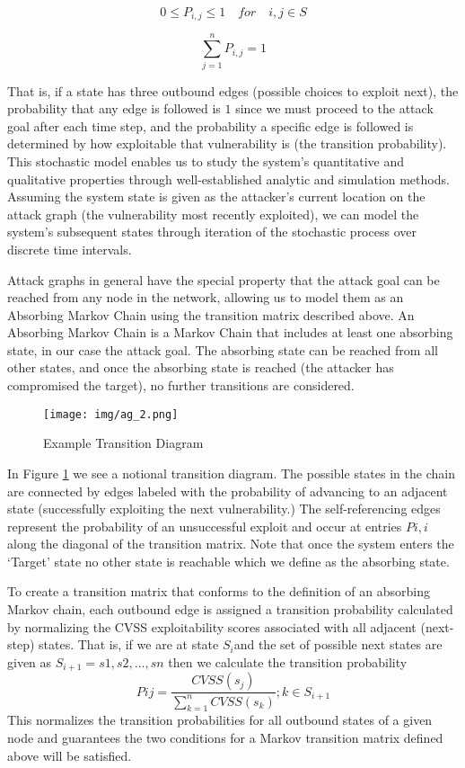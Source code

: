 \[0 \leq P_{i,j} \leq 1\quad for\quad i,j \in S\]

\[\sum_{j=1}^{n} P_{i,j} = 1\]

That is, if a state has three outbound edges (possible choices to exploit next), the probability that any edge is followed is \(1\) since we must proceed to the attack goal after each time step, and the probability a specific edge is followed is determined by how exploitable that vulnerability is (the transition probability). This stochastic model enables us to study the system’s quantitative and qualitative properties through well-established analytic and simulation methods. Assuming the system state is given as the attacker’s current location on the attack graph (the vulnerability most recently exploited), we can model the system’s subsequent states through iteration of the stochastic process over discrete time intervals.  

 

Attack graphs in general have the special property that the attack goal can be reached from any node in the network, allowing us to model them as an Absorbing Markov Chain using the transition matrix described above. An Absorbing Markov Chain is a Markov Chain that includes at least one absorbing state, in our case the attack goal. The absorbing state can be reached from all other states, and once the absorbing state is reached (the attacker has compromised the target), no further transitions are considered.  

\begin{figure}[ht]
\centering
\texttt{[image: img/ag\_2.png]}
\caption{Example Transition Diagram}
\label{fig:ag_2}
\end{figure} 

In Figure \ref{fig:ag_2} we see a  notional transition diagram. The possible states in the chain are connected by edges labeled with the probability of advancing to an adjacent state (successfully exploiting the next vulnerability.) The self-referencing edges represent the probability of an unsuccessful exploit and occur at entries \(Pi,i\) along the diagonal of the transition matrix. Note that once the system enters the ‘Target’ state no other state is reachable which we define as the absorbing state.  

 

To create a transition matrix that conforms to the definition of an absorbing Markov chain, each outbound edge is assigned a transition probability calculated by normalizing the CVSS exploitability scores associated with all adjacent (next-step) states. That is, if we are at state \(S_i \)and the set of possible next states are given as \(S_{i+1} = {s1, s2, \ldots, sn}\) then we calculate the transition probability
\[ Pij =\frac{CVSS(s_j)}{\sum_{k=1}^{n}CVSS(s_k)}; k \in S_{i+1}\]
This normalizes the transition probabilities for all outbound states of a given node and guarantees the two conditions for a Markov transition matrix defined above will be satisfied.  

